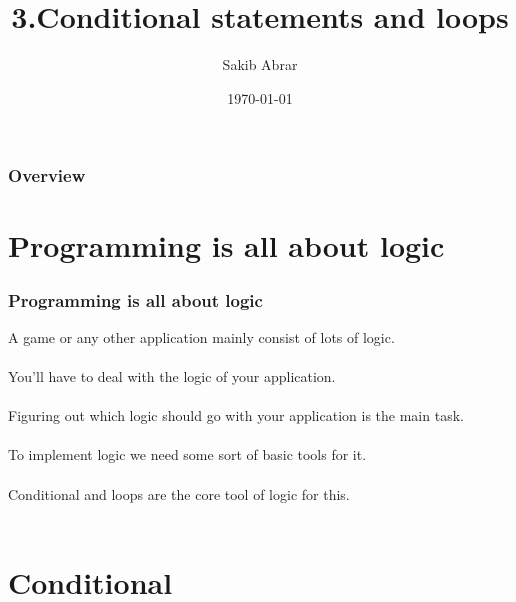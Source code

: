 \documentclass{beamer}
\title[Conditionals \& Loops]{3.Conditional statements and loops} %
\author{Sakib Abrar} %
\institute[BUET] %
{
CSE\\~\\Bangladesh University of Engineering \& Technology \\ %
\medskip
\textit{sakib.cghs@gmail.com} %
}
\date{\today} %
\begin{document}
\begin{frame}
\titlepage %
\end{frame}

\begin{frame}
\frametitle{Overview} %
\tableofcontents %
\end{frame}


\section{Programming is all about logic}

\begin{frame}
\frametitle{Programming is all about logic}
A game or any other application mainly consist of lots of logic.\\~\\
You'll have to deal with the logic of your application.\\~\\
Figuring out which logic should go with your application is the main task.\\~\\
To implement logic we need some sort of basic tools for it. \\~\\
Conditional and loops are the core tool of logic for this.\\~\\


\end{frame}

\section{Conditional}
\end{document}
